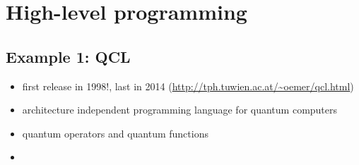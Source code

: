 \documentclass{beamer}
\begin{document}
\begin{frame}{\insertsection}{\insertsubsection}
	
\end{frame}


\begin{frame}{\insertsection}{\insertsubsection}
	
\end{frame}

\begin{frame}{\insertsection}{\insertsubsection}
	
\end{frame}

\section{High-level programming}

\subsection{Example 1: QCL}

\begin{frame}{\insertsection}{\insertsubsection}
	\begin{itemize}
		\item first release in 1998!, last in 2014 (\url{http://tph.tuwien.ac.at/~oemer/qcl.html})
		\item architecture independent programming language for quantum computers
		\item quantum operators and quantum functions
		\item 
	\end{itemize}
	
\end{frame}

\begin{frame}{\insertsection}{\insertsubsection}
	
\end{frame}

\begin{frame}{\insertsection}{\insertsubsection}
	
\end{frame}
\end{document}
